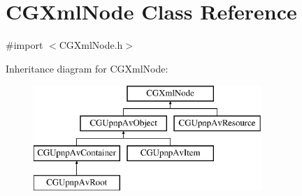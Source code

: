 \hypertarget{interface_c_g_xml_node}{\section{C\-G\-Xml\-Node Class Reference}
\label{interface_c_g_xml_node}
}


{\ttfamily \#import $<$C\-G\-Xml\-Node.\-h$>$}

Inheritance diagram for C\-G\-Xml\-Node\-:\begin{figure}[H]
\begin{center}
\leavevmode
\includegraphics[height=4.000000cm]{interface_c_g_xml_node}
\end{center}
\end{figure}
